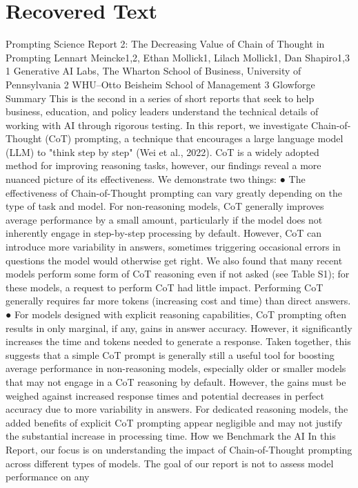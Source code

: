 \section{Recovered Text}
Prompting Science Report 2: The Decreasing Value of Chain of Thought in
Prompting
Lennart Meincke1,2, Ethan Mollick1, Lilach Mollick1, Dan Shapiro1,3
1 Generative AI Labs, The Wharton School of Business, University of Pennsylvania​
2 WHU–Otto Beisheim School of Management​
3 Glowforge
Summary
This is the second in a series of short reports that seek to help business, education, and policy
leaders understand the technical details of working with AI through rigorous testing. In this
report, we investigate Chain-of-Thought (CoT) prompting, a technique that encourages a large
language model (LLM) to "think step by step" (Wei et al., 2022). CoT is a widely adopted
method for improving reasoning tasks, however, our findings reveal a more nuanced picture of
its effectiveness. We demonstrate two things:
●​ The effectiveness of Chain-of-Thought prompting can vary greatly depending on the type
of task and model. For non-reasoning models, CoT generally improves average
performance by a small amount, particularly if the model does not inherently engage in
step-by-step processing by default. However, CoT can introduce more variability in
answers, sometimes triggering occasional errors in questions the model would otherwise
get right. We also found that many recent models perform some form of CoT reasoning
even if not asked (see Table S1); for these models, a request to perform CoT had little
impact. Performing CoT generally requires far more tokens (increasing cost and time)
than direct answers.
●​ For models designed with explicit reasoning capabilities, CoT prompting often results in
only marginal, if any, gains in answer accuracy. However, it significantly increases the
time and tokens needed to generate a response.
Taken together, this suggests that a simple CoT prompt is generally still a useful tool for
boosting average performance in non-reasoning models, especially older or smaller models that
may not engage in a CoT reasoning by default. However, the gains must be weighed against
increased response times and potential decreases in perfect accuracy due to more variability in
answers. For dedicated reasoning models, the added benefits of explicit CoT prompting appear
negligible and may not justify the substantial increase in processing time.
How we Benchmark the AI
In this Report, our focus is on understanding the impact of Chain-of-Thought prompting across
different types of models. The goal of our report is not to assess model performance on any
